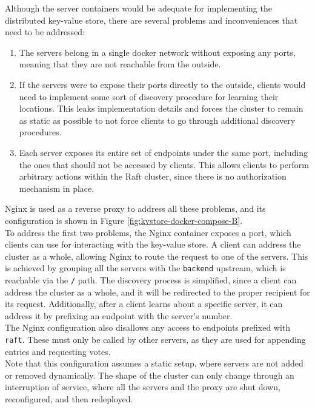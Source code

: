 Although the server containers would be adequate for implementing the distributed key-value store, there are several problems and inconveniences that need to be addressed:
\begin{enumerate}
    \item The servers belong in a single docker network without exposing any ports, meaning that they are not reachable from the outside.
    \item If the servers were to expose their ports directly to the outside, clients would need to implement some sort of discovery procedure for learning their locations. This leaks implementation details and forces the cluster to remain as static as possible to not force clients to go through additional discovery procedures.
    \item Each server exposes its entire set of endpoints under the same port, including the ones that should not be accessed by clients. This allows clients to perform arbitrary actions within the Raft cluster, since there is no authorization mechanism in place.
\end{enumerate}

Nginx is used as a reverse proxy to address all these problems, and its configuration is shown in Figure \ref{fig:kvstore-docker-compose-B}. \\ 

To address the first two problems, the Nginx container exposes a port, which clients can use for interacting with the key-value store. A client can address the cluster as a whole, allowing Nginx to route the request to one of the servers. This is achieved by grouping all the servers with the \lstinline{backend} upstream, which is reachable via the \lstinline{/} path. The discovery process is simplified, since a client can address the cluster as a whole, and it will be redirected to the proper recipient for its request. Additionally, after a client learns about a specific server, it can address it by prefixing an endpoint with the server's number. \\

The Nginx configuration also disallows any access to endpoints prefixed with \lstinline{raft}. These must only be called by other servers, as they are used for appending entries and requesting votes.\\

Note that this configuration assumes a static setup, where servers are not added or removed dynamically. The shape of the cluster can only change through an interruption of service, where all the servers and the proxy are shut down, reconfigured, and then redeployed.

